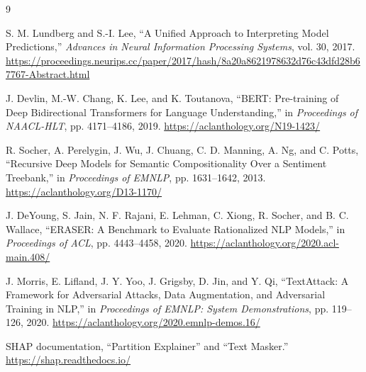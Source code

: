 \documentclass[11pt,a4paper]{article}
\begin{document}
\begin{thebibliography}{9}

S. M. Lundberg and S.-I. Lee,
``A Unified Approach to Interpreting Model Predictions,''
\emph{Advances in Neural Information Processing Systems}, vol. 30, 2017.
\url{https://proceedings.neurips.cc/paper/2017/hash/8a20a8621978632d76c43dfd28b67767-Abstract.html}

J. Devlin, M.-W. Chang, K. Lee, and K. Toutanova,
``BERT: Pre-training of Deep Bidirectional Transformers for Language Understanding,''
in \emph{Proceedings of NAACL-HLT}, pp. 4171--4186, 2019.
\url{https://aclanthology.org/N19-1423/}

R. Socher, A. Perelygin, J. Wu, J. Chuang, C. D. Manning, A. Ng, and C. Potts,
``Recursive Deep Models for Semantic Compositionality Over a Sentiment Treebank,''
in \emph{Proceedings of EMNLP}, pp. 1631--1642, 2013.
\url{https://aclanthology.org/D13-1170/}

J. DeYoung, S. Jain, N. F. Rajani, E. Lehman, C. Xiong, R. Socher, and B. C. Wallace,
``ERASER: A Benchmark to Evaluate Rationalized NLP Models,''
in \emph{Proceedings of ACL}, pp. 4443--4458, 2020.
\url{https://aclanthology.org/2020.acl-main.408/}

J. Morris, E. Lifland, J. Y. Yoo, J. Grigsby, D. Jin, and Y. Qi,
``TextAttack: A Framework for Adversarial Attacks, Data Augmentation, and
Adversarial Training in NLP,'' in \emph{Proceedings of EMNLP: System
Demonstrations}, pp. 119--126, 2020.
\url{https://aclanthology.org/2020.emnlp-demos.16/}

SHAP documentation,
``Partition Explainer'' and ``Text Masker.''
\url{https://shap.readthedocs.io/}

\end{thebibliography}
\end{document}
